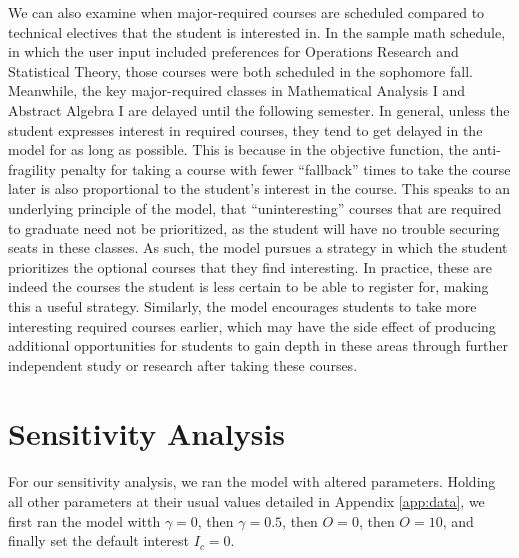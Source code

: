 \documentclass[12pt]{article}
\begin{document}
We can also examine when major-required courses are scheduled compared to technical electives that the student is interested in. In the sample math schedule, in which the user input included preferences for Operations Research and Statistical Theory, those courses were both scheduled in the sophomore fall. Meanwhile, the key major-required classes in Mathematical Analysis I and Abstract Algebra I are delayed until the following semester. In general, unless the student expresses interest in required courses, they tend to get delayed in the model for as long as possible. This is because in the objective function, the anti-fragility penalty for taking a course with fewer ``fallback'' times to take the course later is also proportional to the student's interest in the course. This speaks to an underlying principle of the model, that ``uninteresting'' courses that are required to graduate need not be prioritized, as the student will have no trouble securing seats in these classes. As such, the model pursues a strategy in which the student prioritizes the optional courses that they find interesting. In practice, these are indeed the courses the student is less certain to be able to register for, making this a useful strategy. %
Similarly, the model encourages students to take more interesting required courses earlier, which may have the side effect of producing additional opportunities for students to gain depth in these areas through further independent study or research after taking these courses.

\section{Sensitivity Analysis}\label{sec:sensitivity}

For our sensitivity analysis, we ran the model with altered parameters. Holding all other parameters at their usual values detailed in Appendix \ref{app:data}, we first ran the model witth $\gamma = 0$, then $\gamma = 0.5$, then $O = 0$, then $O = 10$, and finally set the default interest $I_c = 0$.
\end{document}
